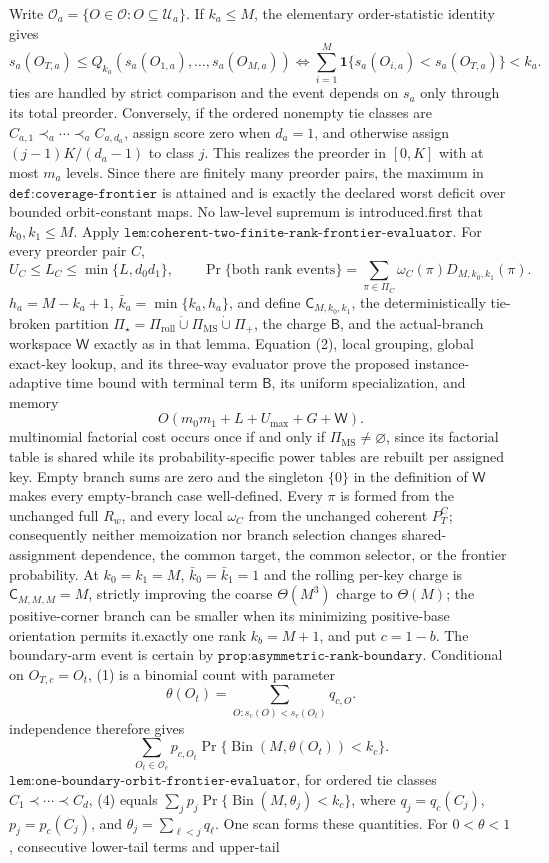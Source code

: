 Write \(\mathcal O_a=\{O\in\mathcal O:O\subseteq\mathcal U_a\}\). If \(k_a\le M\), the elementary order-statistic identity gives\n\[s_a(O_{T,a})\le Q_{k_a}(s_a(O_{1,a}),\ldots,s_a(O_{M,a}))\iff\sum_{i=1}^M\mathbf 1\{s_a(O_{i,a})<s_a(O_{T,a})\}<k_a.\tag{1}\]\nThus ties are handled by strict comparison and the event depends on \(s_a\) only through its total preorder. Conversely, if the ordered nonempty tie classes are \(C_{a,1}\prec_a\cdots\prec_a C_{a,d_a}\), assign score zero when \(d_a=1\), and otherwise assign \((j-1)K/(d_a-1)\) to class \(j\). This realizes the preorder in \([0,K]\) with at most \(m_a\) levels. Since there are finitely many preorder pairs, the maximum in \(\texttt{def:coverage-frontier}\) is attained and is exactly the declared worst deficit over bounded orbit-constant maps. No law-level supremum is introduced.\n\nSuppose first that \(k_0,k_1\le M\). Apply \(\texttt{lem:coherent-two-finite-rank-frontier-evaluator}\). For every preorder pair \(C\),\n\[U_C\le L_C\le\min\{L,d_0d_1\},\qquad \Pr\{\text{both rank events}\}=\sum_{\pi\in\Pi_C}\omega_C(\pi)D_{M,k_0,k_1}(\pi).\tag{2}\]\nPut \(h_a=M-k_a+1\), \(\bar k_a=\min\{k_a,h_a\}\), and define \(\mathsf C_{M,k_0,k_1}\), the deterministically tie-broken partition \(\Pi_\star=\Pi_{\mathrm{roll}}\mathbin{\dot\cup}\Pi_{\mathrm{MS}}\mathbin{\dot\cup}\Pi_+\), the charge \(\mathsf B\), and the actual-branch workspace \(\mathsf W\) exactly as in that lemma. Equation (2), local grouping, global exact-key lookup, and its three-way evaluator prove the proposed instance-adaptive time bound with terminal term \(\mathsf B\), its uniform specialization, and memory\n\[O(m_0m_1+L+U_{\max}+G+\mathsf W).\tag{3}\]\nThe multinomial factorial cost occurs once if and only if \(\Pi_{\mathrm{MS}}\ne\varnothing\), since its factorial table is shared while its probability-specific power tables are rebuilt per assigned key. Empty branch sums are zero and the singleton \(\{0\}\) in the definition of \(\mathsf W\) makes every empty-branch case well-defined. Every \(\pi\) is formed from the unchanged full \(R_w\), and every local \(\omega_C\) from the unchanged coherent \(P_T^C\); consequently neither memoization nor branch selection changes shared-assignment dependence, the common target, the common selector, or the frontier probability. At \(k_0=k_1=M\), \(\bar k_0=\bar k_1=1\) and the rolling per-key charge is \(\mathsf C_{M,M,M}=M\), strictly improving the coarse \(\Theta(M^3)\) charge to \(\Theta(M)\); the positive-corner branch can be smaller when its minimizing positive-base orientation permits it.\n\nSuppose exactly one rank \(k_b=M+1\), and put \(c=1-b\). The boundary-arm event is certain by \(\texttt{prop:asymmetric-rank-boundary}\). Conditional on \(O_{T,c}=O_t\), (1) is a binomial count with parameter\n\[\theta(O_t)=\sum_{O:s_c(O)<s_c(O_t)}q_{c,O}.\]\nTarget independence therefore gives\n\[\sum_{O_t\in\mathcal O_c}p_{c,O_t}\Pr\{\operatorname{Bin}(M,\theta(O_t))<k_c\}.\tag{4}\]\nBy \(\texttt{lem:one-boundary-orbit-frontier-evaluator}\), for ordered tie classes \(C_1\prec\cdots\prec C_d\), (4) equals \(\sum_jp_j\Pr\{\operatorname{Bin}(M,\theta_j)<k_c\}\), where \(q_j=q_c(C_j)\), \(p_j=p_c(C_j)\), and \(\theta_j=\sum_{\ell<j}q_\ell\). One scan forms these quantities. For \(0<\theta<1\), consecutive lower-tail terms and upper-tail 